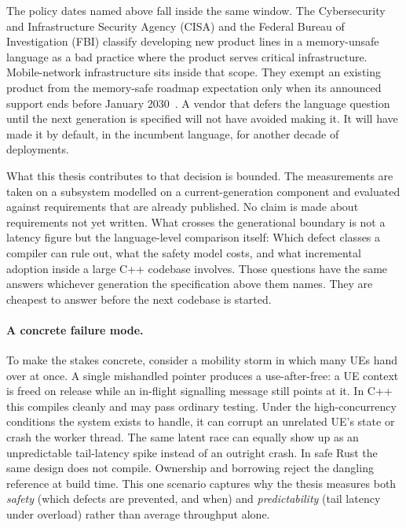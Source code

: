 \documentclass[english,oneside,a4paper,censored,csm,software-track-2020]{HYthesisML}
\begin{document}
The policy dates named above fall inside the same window. The Cybersecurity and
Infrastructure Security Agency (CISA) and the Federal Bureau of Investigation (FBI) classify
developing new product lines in a memory-unsafe language as a bad practice where the product
serves critical infrastructure. Mobile-network infrastructure sits inside that scope. They
exempt an existing product from the memory-safe roadmap expectation only when its announced
support ends before January 2030~\cite{cisa2025badpractices}. A vendor that defers
the language question until the next generation is specified will not have avoided
making it. It will have made it by default, in the incumbent language, for another decade of
deployments.

What this thesis contributes to that decision is bounded. The measurements are taken on a
subsystem modelled on a current-generation component and evaluated against requirements that are
already published. No claim is made about requirements not yet written. What crosses the
generational boundary is not a latency figure but the language-level comparison itself: Which
defect classes a compiler can rule out, what the safety model costs, and what incremental
adoption inside a large C++ codebase involves. Those questions have the same answers whichever
generation the specification above them names. They are cheapest to answer before the next
codebase is started.

\paragraph{A concrete failure mode.}
To make the stakes concrete, consider a mobility storm in which many UEs hand over at once. A
single mishandled pointer produces a use-after-free: a UE context is freed on release while an
in-flight signalling message still points at it. In C++ this compiles cleanly and may pass
ordinary testing. Under the high-concurrency conditions the system exists to handle, it can
corrupt an unrelated UE's state or crash the worker thread. The same latent race can equally
show up as an unpredictable tail-latency spike instead of an outright crash. In safe Rust
the same design does not compile. Ownership and borrowing reject the dangling reference at
build time. This one scenario captures why the thesis measures both \emph{safety} (which
defects are prevented, and when) and \emph{predictability} (tail latency under overload)
rather than average throughput alone.
\end{document}
